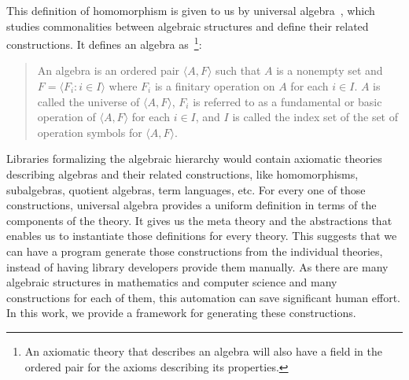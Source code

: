 This definition of homomorphism is given to us by universal algebra~\cite{whitehead1898treatise}, which studies commonalities between algebraic structures and define their related constructions.
It defines an algebra as~\cite{mckenzie1987algebras}\footnote{An axiomatic theory that describes an algebra will also have a field in the ordered pair for the axioms describing its properties.}: 
\begin{quote}
    An algebra is an ordered pair $\langle A, F \rangle$ such that $A$ is a nonempty set and $F = \langle F_i : i \in I \rangle$ where $F_i$ is a finitary operation on $A$ for each $i \in I$. $A$ is called the universe of $\langle A, F \rangle$, $F_i$ is referred to as a fundamental or basic operation of $\langle A, F \rangle$ for each $i \in I$, and $I$ is called the index set of the set of operation symbols for $\langle A, F \rangle$. 
\end{quote}
Libraries formalizing the algebraic hierarchy would contain axiomatic theories describing algebras and their related constructions, like homomorphisms, subalgebras, quotient algebras, term languages, etc. 
For every one of those constructions, universal algebra provides a uniform definition in terms of the components of the theory. 
It gives us the meta theory and the abstractions that enables us to instantiate those definitions for every theory. This suggests that we can have a program generate those constructions from the individual theories, instead of having library developers provide them manually. As there are many algebraic structures in mathematics and computer science and many constructions for each of them, this automation can save significant human effort. In this work, we provide a framework for generating these constructions. 

